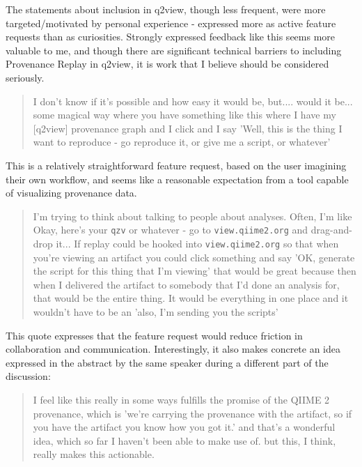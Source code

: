 The statements about inclusion in q2view, though less frequent, were more
targeted/motivated by personal experience - expressed more as active feature
requests than as curiosities. Strongly expressed feedback like this seems more
valuable to me, and though there are significant technical barriers to including
Provenance Replay in q2view, it is work that I believe should be considered
seriously. 

\begin{quote}
I don't know if it's possible and how easy it would be, but.... would it be...
some magical way where you have something like this where I have my [q2view]
provenance graph and I click and I say 'Well, this is the thing I want to
reproduce - go reproduce it, or give me a script, or whatever'
\end{quote}

\noindent This is a relatively straightforward feature request, based on the user
imagining their own workflow, and seems like a reasonable expectation from a
tool capable of visualizing provenance data.

\begin{quote}
I'm trying to think about talking to people about analyses. Often, I'm like
Okay, here's your \texttt{qzv} or whatever - go to \texttt{view.qiime2.org} and drag-and-drop
it... If replay could be hooked into \texttt{view.qiime2.org} so that when you're viewing
an artifact you could click something and say 'OK, generate the script for this
thing that I'm viewing' that would be great because then when I delivered the
artifact to somebody that I'd done an analysis for, that would be the entire
thing. It would be everything in one place and it wouldn't have to be an 'also,
I'm sending you the scripts'
\end{quote}

\noindent This quote expresses that the feature request would reduce friction in
collaboration and communication. Interestingly, it also makes concrete an idea
expressed in the abstract by the same speaker during a different part of the
discussion:

\begin{quote}
I feel like this really in some ways fulfills the promise of the QIIME 2
provenance, which is 'we're carrying the provenance with the artifact, so if you
have the artifact you know how you got it.' and that's a wonderful idea, which
so far I haven't been able to make use of. but this, I think, really makes this
actionable.
\end{quote}

